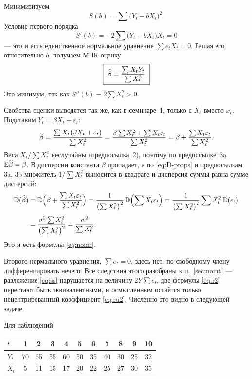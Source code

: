 \begin{solution}
Минимизируем
\[
  S(b) = \sum\bigl(Y_t - bX_t\bigr)^2 .
\]
Условие первого порядка
\[
  S'(b) = -2\sum\bigl(Y_t - bX_t\bigr)X_t = 0
\]
— это и есть единственное нормальное уравнение $\sum e_tX_t = 0$. Решая его
относительно $b$, получаем МНК-оценку
\[
  \boxed{\ \widehat{\beta} = \frac{\sum X_tY_t}{\sum X_t^2}\ }
\]
Это минимум, так как $S''(b) = 2\sum X_t^2 > 0$.

\medskip
Свойства оценки выводятся так же, как в семинаре~1, только с $X_t$ вместо
$x_t$. Подставим $Y_t = \beta X_t + \varepsilon_t$:
\[
  \widehat{\beta} = \frac{\sum X_t\bigl(\beta X_t + \varepsilon_t\bigr)}{\sum X_t^2}
      = \frac{\beta\sum X_t^2 + \sum X_t\varepsilon_t}{\sum X_t^2}
      = \beta + \frac{\sum X_t\varepsilon_t}{\sum X_t^2}.
\]
Веса $X_t/\sum X_t^2$ неслучайны (предпосылка~2), поэтому по предпосылке~3a
$\mathbb{E}\widehat{\beta} = \beta$. В дисперсии константа $\beta$ пропадает, а по
\eqref{eq:D-props} и предпосылкам 3a, 3b множитель $1/\sum X_t^2$ выносится в
квадрате и дисперсия суммы равна сумме дисперсий:
\[
\begin{aligned}
  \mathbb{D}(\widehat{\beta}) &= \mathbb{D}\Bigl(\beta + \frac{\sum X_t\varepsilon_t}{\sum X_t^2}\Bigr)
           = \frac{1}{\bigl(\sum X_t^2\bigr)^2}\,\mathbb{D}\Bigl(\sum X_t\varepsilon_t\Bigr)
           = \frac{1}{\bigl(\sum X_t^2\bigr)^2}\sum X_t^2\,\mathbb{D}(\varepsilon_t) \\[4pt]
          &= \frac{\sigma^2\sum X_t^2}{\bigl(\sum X_t^2\bigr)^2}
           = \frac{\sigma^2}{\sum X_t^2}.
\end{aligned}
\]
Это и есть формулы \eqref{eq:noint}.

\medskip
Второго нормального уравнения, $\sum e_t = 0$, здесь нет: по свободному члену
дифференцировать нечего. Все следствия этого разобраны в п.~\ref{sec:noint} —
разложение \eqref{eq:ss} нарушается на величину $2\overline{Y}\sum e_t$, две
формулы \eqref{eq:r2} перестают быть эквивалентными, и осмысленным остаётся
только нецентрированный коэффициент \eqref{eq:ru2}. Численно это видно в
следующей задаче.
\end{solution}


Для наблюдений

\begin{center}
\begin{tabular}{l *{10}{c}}
\toprule
$t$ & 1 & 2 & 3 & 4 & 5 & 6 & 7 & 8 & 9 & 10 \\
\midrule
$Y_t$ & 70 & 65 & 55 & 60 & 50 & 35 & 40 & 30 & 25 & 32 \\
$X_t$ &  5 & 11 & 15 & 17 & 20 & 22 & 25 & 27 & 30 & 35 \\
\bottomrule
\end{tabular}
\end{center}

